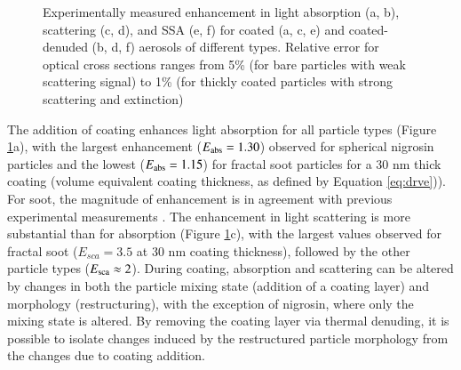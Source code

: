 \begin{figure}[htp]
{
    }
    \caption{Experimentally measured enhancement in light absorption (a, b), scattering (c, d), and SSA (e, f) for coated (a, c, e) and coated-denuded (b, d, f) aerosols of different types. Relative error for optical cross sections ranges from 5\% (for bare particles with weak scattering signal) to 1\% (for thickly coated particles with strong scattering and extinction)}
    \label{fig:opt_data}
\end{figure}



The addition of coating enhances light absorption for all particle types (Figure \ref{fig:opt_data}a), with the largest enhancement ($E_{\rm abs}=1.30$) observed for spherical nigrosin particles and the lowest ($E_{\rm abs}=1.15$) for fractal soot particles for a 30 nm thick coating (volume equivalent coating thickness, as defined by Equation \ref{eq:drve})). For soot, the magnitude of enhancement is in agreement with previous experimental measurements \citep{RN41,RN7}. The enhancement in light scattering is more substantial than for absorption (Figure \ref{fig:opt_data}c), with the largest values observed for fractal soot ($E_{sca} = 3.5$ at 30 nm coating thickness), followed by the other particle types ($E_{\rm sca} \approx 2$). During coating, absorption and scattering can be altered by changes in both the particle mixing state (addition of a coating layer) and morphology (restructuring), with the exception of nigrosin, where only the mixing state is altered. By removing the coating layer via thermal denuding, it is possible to isolate changes induced by the restructured particle morphology from the changes due to coating addition.

